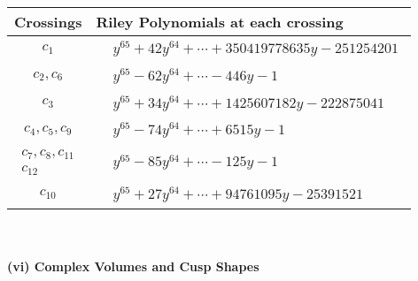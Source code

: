 \documentclass[1p]{elsarticle_modified}
\theoremstyle{definition}
\begin{document}
\begin{tabular}{m{50pt}|m{274pt}}
Crossings & \hspace{64pt}Riley Polynomials at each crossing \\
\hline $$\begin{aligned}c_{1}\end{aligned}$$&$\begin{aligned}
&y^{65}+42 y^{64}+\cdots+350419778635 y-251254201
\end{aligned}$\\
\hline $$\begin{aligned}c_{2},c_{6}\end{aligned}$$&$\begin{aligned}
&y^{65}-62 y^{64}+\cdots-446 y-1
\end{aligned}$\\
\hline $$\begin{aligned}c_{3}\end{aligned}$$&$\begin{aligned}
&y^{65}+34 y^{64}+\cdots+1425607182 y-222875041
\end{aligned}$\\
\hline $$\begin{aligned}c_{4},c_{5},c_{9}\end{aligned}$$&$\begin{aligned}
&y^{65}-74 y^{64}+\cdots+6515 y-1
\end{aligned}$\\
\hline $$\begin{aligned}c_{7},c_{8},c_{11}\\c_{12}\end{aligned}$$&$\begin{aligned}
&y^{65}-85 y^{64}+\cdots-125 y-1
\end{aligned}$\\
\hline $$\begin{aligned}c_{10}\end{aligned}$$&$\begin{aligned}
&y^{65}+27 y^{64}+\cdots+94761095 y-25391521
\end{aligned}$\\
\hline
\end{tabular}\\~\\
\newpage\flushleft \textbf{(vi) Complex Volumes and Cusp Shapes}
\end{document}
